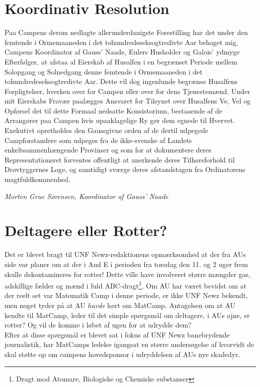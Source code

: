 

\begin{minipage}[b]{0.95\linewidth}
\begin{minipage}[t]{0.47\textwidth}
\vspace{3mm}
\section*{Koordinativ Resolution}

Paa Campens derom nedlagte allerunderdanigste Forestilling har det under den femtende i Ormemaaneden i det tohundredeseksogtredivte Aar behaget mig, Campens Koordinator af Gauss' Naade, Eulers Husholder og Galois' ydmyge Efterfølger, at afstaa al Eierskab af Husalfen i en begrænset Periode mellem Solopgang og Solnedgang denne femtende i Ormemaaneden i det tohundredeseksogtredivte Aar. Dette vil dog ingenlunde begrænse Husalfens Forpligtelser, hverken over for Campen eller over for dens Tjenestemænd. Under mit Eierskabs Fravær paalægges Ansvaret for Tilsynet over Husalfens Ve, Vel og Opførsel det til dette Formaal nedsatte Konsistorium, bestaaende af de Arrangører paa Campen hvis upaaklagelige Ry gør dem egnede til Hvervet. Exekutivt opretholdes den Gaussgivne orden af de dertil udpegede Campforstandere som udpeges fra de ikke-svenske af Landets enkeltsammenhængende Provinser og som for at dokumentere deres Representationsret forventes offentligt at anerkende deres Tilhørsforhold til Drøvtyggernes Loge, og samtidigt sværge deres afstandstagen fra Ordinatorens magtfuldkommenhed.

{\flushright\emph{Morten Grue Sørensen, Koordinator af Gauss' Naade }}

\section*{Deltagere eller Rotter?}
Det er blevet bragt til UNF Newz-redaktionens opmærksomhed at der fra AUs side var planer om at der i Aud E i perioden fra torsdag den 11. og 2 uger frem skulle dekontamineres for rotter! Dette ville have involveret større mængder gas, adskillige fælder og mænd i fuld ABC-dragt\footnote{Dragt mod Atomare, Biologiske og Chemiske substanser}. Om AU har været bevidst om at der reelt set var Matematik Camp i denne periode, er ikke UNF Newz bekendt, men noget tyder på at AU \emph{havde} hørt om MatCamp. Antagelsen om at AU kendte til MatCamp, leder til det simple spørgsmål om deltagere, i AUs øjne, er rotter?
Og vil de komme i løbet af ugen for at udrydde dem? \\
Efter at disse spørgsmål er blevet sat i fokus af UNF Newz banebrydende journalistik, har MatCamps ledelse igangsat en større undersøgelse af hvorvidt de skal støtte op om campens hovedsponsor i udryddelsen af AUs nye skadedyr.


\end{minipage}
\end{minipage}
